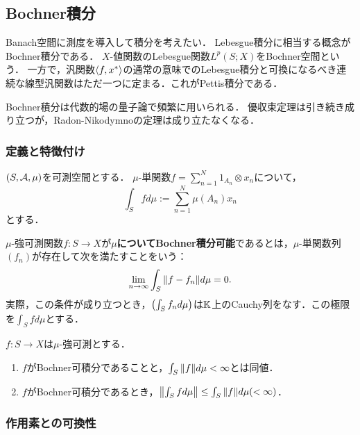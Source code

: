 \documentclass[uplatex,dvipdfmx]{jsreport}
\begin{document}
\subsection{Bochner積分}

\begin{tcolorbox}[colframe=ForestGreen, colback=ForestGreen!10!white,breakable,colbacktitle=ForestGreen!40!white,coltitle=black,fonttitle=\bfseries\sffamily,
    title=]
    Banach空間に測度を導入して積分を考えたい．
    Lebesgue積分に相当する概念がBochner積分である．
    $X$-値関数のLebesgue関数$L^p(S;X)$をBochner空間という．
    一方で，汎関数$\langle f,x^*\rangle$の通常の意味でのLebesgue積分と可換になるべき連続な線型汎関数はただ一つに定まる．これがPettis積分である．

    Bochner積分は代数的場の量子論で頻繁に用いられる．
    優収束定理は引き続き成り立つが，Radon-Nikodymnoの定理は成り立たなくなる．
\end{tcolorbox}

\subsubsection{定義と特徴付け}

\begin{notation}
    $(S,\mathcal{A},\mu)$を可測空間とする．
    $\mu$-単関数$f=\sum^N_{n=1}1_{A_n}\otimes x_n$について，
    \[\int_Sfd\mu:=\sum^N_{n=1}\mu(A_n)x_n\]
    とする．
\end{notation}

\begin{definition}
    $\mu$-強可測関数$f:S\to X$が\textbf{$\mu$についてBochner積分可能}であるとは，$\mu$-単関数列$(f_n)$が存在して次を満たすことをいう：
    \[\lim_{n\to\infty}\int_S\|f-f_n\|d\mu=0.\]
    実際，この条件が成り立つとき，$\left(\int_Sf_nd\mu\right)$は$\mathbb{K}$上のCauchy列をなす．この極限を$\int_Sfd\mu$とする．
\end{definition}

\begin{lemma}
    $f:S\to X$は$\mu$-強可測とする．
    \begin{enumerate}
        \item $f$がBochner可積分であることと，$\int_S\|f\|d\mu<\infty$とは同値．
        \item $f$がBochner可積分であるとき，$\left\|\int_Sfd\mu\right\|\le\int_S\|f\|d\mu(<\infty)$．
    \end{enumerate}
\end{lemma}

\subsubsection{作用素との可換性}
\end{document}
